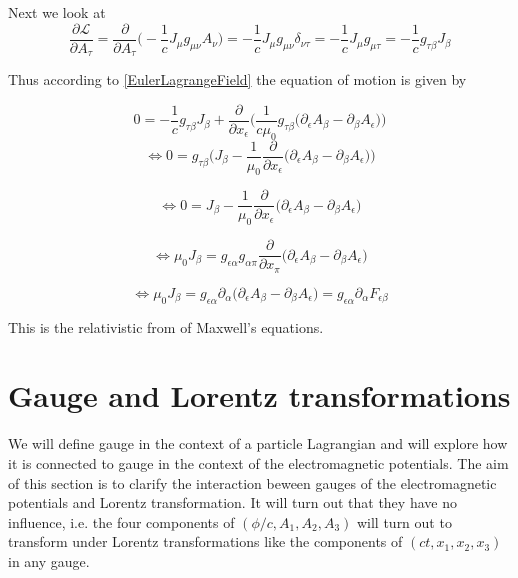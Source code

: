 \documentclass{article}
\begin{document}
Next we look at
\begin{equation}
  \frac{\partial \mathcal{L}}{\partial A_\tau}
  = \frac{\partial }{\partial A_\tau} \bigg( - \frac{1}{c} J_\mu g_{\mu\nu} A_\nu \bigg)
  = - \frac{1}{c} J_\mu g_{\mu\nu} \delta_{\nu\tau}
  = - \frac{1}{c} J_\mu g_{\mu\tau}
  = - \frac{1}{c} g_{\tau\beta} J_\beta
\end{equation}

Thus according to \ref{EulerLagrangeField} the equation of motion is given by

\begin{equation}
  0 = - \frac{1}{c} g_{\tau\beta} J_\beta
  + \frac{\partial}{\partial x_\epsilon}
  \bigg(
  \frac{1}{c \mu_0} g_{\tau\beta}
  \bigg(
  \partial_\epsilon A_\beta - \partial_\beta A_\epsilon
  \bigg)
  \bigg)
\end{equation}
\begin{equation}
  \iff 0 = g_{\tau\beta} \bigg(J_\beta
  - \frac{1}{\mu_0}  \frac{\partial}{\partial x_\epsilon}\big( \partial_\epsilon A_\beta - \partial_\beta A_\epsilon \big) \bigg)
\end{equation}

\begin{equation}
  \iff 0 = J_\beta - \frac{1}{\mu_0}  \frac{\partial}{\partial x_\epsilon}\big( \partial_\epsilon A_\beta - \partial_\beta A_\epsilon \big)
\end{equation}

\begin{equation}
  \iff \mu_0 J_\beta = g_{\epsilon\alpha}g_{\alpha\pi}\frac{\partial}{\partial x_\pi}\big( \partial_\epsilon A_\beta - \partial_\beta A_\epsilon \big)
\end{equation}

\begin{equation} \label{equationOfMotionUntransformed}
\iff \mu_0 J_\beta = g_{\epsilon\alpha}  \partial_\alpha \big(\partial_\epsilon A_\beta - \partial_\beta A_\epsilon \big)
= g_{\epsilon\alpha}  \partial_\alpha F_{\epsilon\beta}
\end{equation}

This is the relativistic from of Maxwell's equations.

\section{Gauge and Lorentz transformations} \label{sectionGauge}
We will define gauge in the context of a particle Lagrangian and will explore how it is connected to gauge in the context of the electromagnetic potentials.
The aim of this section is to clarify the interaction beween gauges of the electromagnetic potentials and Lorentz transformation.
It will turn out that they have no influence,
i.e. the four components of $(\phi/c, A_1,A_2,A_3)$ will turn out to transform under Lorentz transformations like the components of $(ct,x_1,x_2,x_3)$ in any gauge.
\end{document}

